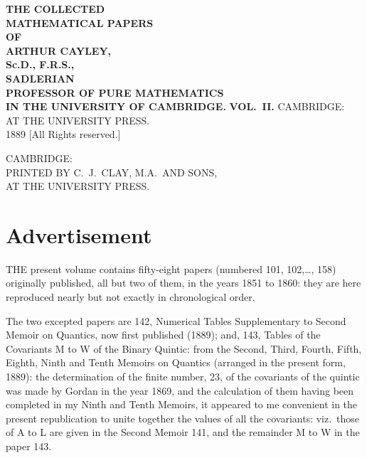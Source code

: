 \documentclass[11pt,a4paper]{article}
\theoremstyle{plain}
\begin{document}
\thispagestyle{empty}
\begin{center}
\vspace*{2cm}
{\LARGE\bfseries THE COLLECTED\\[0.3em] MATHEMATICAL PAPERS\\[1.5em] OF\\[1.5em] ARTHUR CAYLEY,\\[0.8em] Sc.D., F.R.S.,\\[0.5em] SADLERIAN\\ PROFESSOR OF PURE MATHEMATICS\\ IN THE UNIVERSITY OF CAMBRIDGE.}
\vspace{2cm}
{\LARGE\bfseries VOL.\ II.}
\vfill
{\large CAMBRIDGE:\\ AT THE UNIVERSITY PRESS.\\ 1889}
\vspace{1cm}
{\small [All Rights reserved.]}
\end{center}
\clearpage

\thispagestyle{empty}
\begin{center}
\vfill
CAMBRIDGE:\\ PRINTED BY C.\ J.\ CLAY, M.A.\ AND SONS,\\ AT THE UNIVERSITY PRESS.
\vfill
\end{center}
\clearpage

\section*{Advertisement}

THE present volume contains fifty-eight papers (numbered 101, 102,\ldots, 158) originally published, all but two of them, in the years 1851 to 1860: they are here reproduced nearly but not exactly in chronological order.

The two excepted papers are 142, Numerical Tables Supplementary to Second Memoir on Quantics, now first published (1889); and, 143, Tables of the Covariants M to W of the Binary Quintic: from the Second, Third, Fourth, Fifth, Eighth, Ninth and Tenth Memoirs on Quantics (arranged in the present form, 1889): the determination of the finite number, 23, of the covariants of the quintic was made by Gordan in the year 1869, and the calculation of them having been completed in my Ninth and Tenth Memoirs, it appeared to me convenient in the present republication to unite together the values of all the covariants: viz.\ those of A to L are given in the Second Memoir 141, and the remainder M to W in the paper 143.
\end{document}
